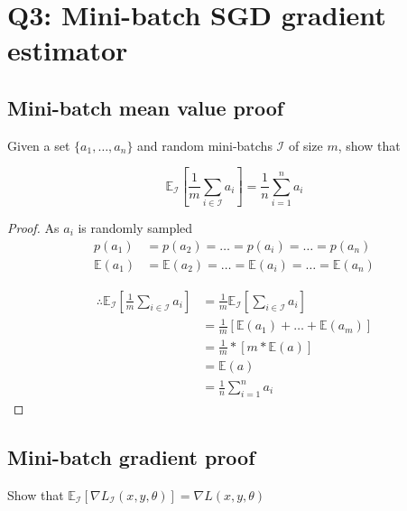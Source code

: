 \documentclass[a4paper]{article}
\begin{document}
\section{Q3: Mini-batch SGD gradient estimator}

\subsection{Mini-batch mean value proof}

Given a set $\{a_1, \dots, a_n\}$ and random mini-batchs $\mathcal{I}$ of size $m$, show that

\begin{equation}
    \mathbb{E}_{\mathcal{I}}[\frac{1}{m}\sum_{i\in \mathcal{I}}a_i]=\frac{1}{n}\sum_{i=1}^na_i
\end{equation}

\begin{proof}
    \qquad As $a_i$ is randomly sampled
    \begin{align*}
        p(a_1)&=p(a_2)=\dots=p(a_i)=\dots=p(a_n)\\
        \mathbb{E}(a_1)&=\mathbb{E}(a_2)=\dots=\mathbb{E}(a_i)=\dots=\mathbb{E}(a_n)
    \end{align*}

    \begin{align*}
        \therefore\mathbb{E}_{\mathcal{I}}[\frac{1}{m}\sum_{i\in \mathcal{I}}a_i]&=\frac{1}{m}\mathbb{E}_{\mathcal{I}}[\sum_{i\in \mathcal{I}}a_i]\\
        &=\frac{1}{m}[\mathbb{E}(a_1)+\dots+\mathbb{E}(a_m)]\\
        &=\frac{1}{m}*[m*\mathbb{E}(a)]\\
        &=\mathbb{E}(a)\\
        &=\frac{1}{n}\sum_{i=1}^na_i
    \end{align*}
\end{proof}

\subsection{Mini-batch gradient proof}

Show that $\mathbb{E}_\mathcal{I}[\nabla L_{\mathcal{I}}(x,y,\theta)]=\nabla L(x,y,\theta)$
\end{document}
